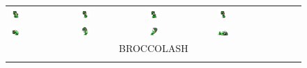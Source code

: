 \documentclass[book.tex]{subfiles}
\begin{document}
\begin{figure}[H]
\begin{table}[H]
\begin{tabularx}{\textwidth}[c]{|XXXXXX|}
  \includegraphics[width=0.18\textwidth]{screenshots_300dpi/game/sprite2a.png} &
  \includegraphics[width=0.18\textwidth]{screenshots_300dpi/game/sprite2b.png} &
  \includegraphics[width=0.18\textwidth]{screenshots_300dpi/game/sprite2c.png} &
  \includegraphics[width=0.18\textwidth]{screenshots_300dpi/game/sprite2d.png} \\  
  \includegraphics[width=0.18\textwidth]{screenshots_300dpi/game/sprite2e.png} &
  \includegraphics[width=0.18\textwidth]{screenshots_300dpi/game/sprite2f.png} &
  \includegraphics[width=0.18\textwidth]{screenshots_300dpi/game/sprite2g.png} & 
  \includegraphics[width=0.18\textwidth]{screenshots_300dpi/game/sprite2h.png} & & \\  
  \multicolumn{6}{|c|}{BROCCOLASH}  \\ \hline
  \multicolumn{6}{c}{}  \\ \hline
    

\end{tabularx}
\end{table}
\end{figure}
\end{document}
